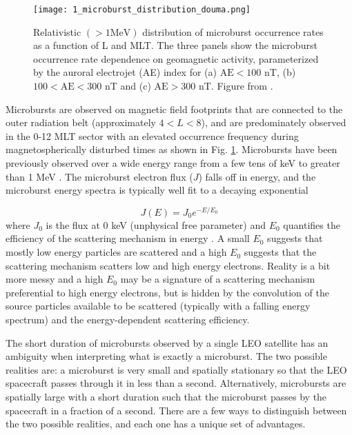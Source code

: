 \begin{figure}
\texttt{[image: 1\_microburst\_distribution\_douma.png]}
\caption{Relativistic $(> 1 \mathrm{MeV})$ distribution of microburst occurrence rates as a function of L and MLT. The three panels show the microburst occurrence rate dependence on geomagnetic activity, parameterized by the auroral electrojet (AE) index for (a) $\mathrm{AE} < 100$ nT, (b) $100 < \mathrm{AE} < 300$ nT and (c) $\mathrm{AE} > 300$ nT. Figure from \citet{Douma2017}.}
\label{Intro:microburst_distribution}
\end{figure}

Microbursts are observed on magnetic field footprints that are connected to the outer radiation belt (approximately $4 < L < 8$), and are predominately observed in the 0-12 MLT sector with an elevated occurrence frequency during magnetospherically disturbed times as shown in Fig. \ref{Intro:microburst_distribution}. Microbursts have been previously observed over a wide energy range from a few tens of keV \citep{Datta1997, Parks1967} to greater than 1 MeV \citep[e.g.][]{Blake1996, Greeley2019}. The microburst electron flux ($J$) falls off in energy, and the microburst energy spectra is typically well fit to a decaying exponential 

\begin{equation}
J(E) = J_0 e^{-E/E_0}
\end{equation} where $J_0$ is the flux at 0 keV (unphysical free parameter) and $E_0$ quantifies the efficiency of the scattering mechanism in energy \citep[.e.g][]{Parks1967, Datta1997, Lee2005}. A small $E_0$ suggests that mostly low energy particles are scattered and a high $E_0$ suggests that the scattering mechanism scatters low and high energy electrons. Reality is a bit more messy and a high $E_0$ may be a signature of a scattering mechanism preferential to high energy electrons, but is hidden by the convolution of the source particles available to be scattered (typically with a falling energy spectrum) and the energy-dependent scattering efficiency.

The short duration of microbursts observed by a single LEO satellite has an ambiguity when interpreting what is exactly a microburst. The two possible realities are: a microburst is very small and spatially stationary so that the LEO spacecraft passes through it in less than a second. Alternatively, microbursts are spatially large with a short duration such that the microburst passes by the spacecraft in a fraction of a second. There are a few ways to distinguish between the two possible realities, and each one has a unique set of advantages.

